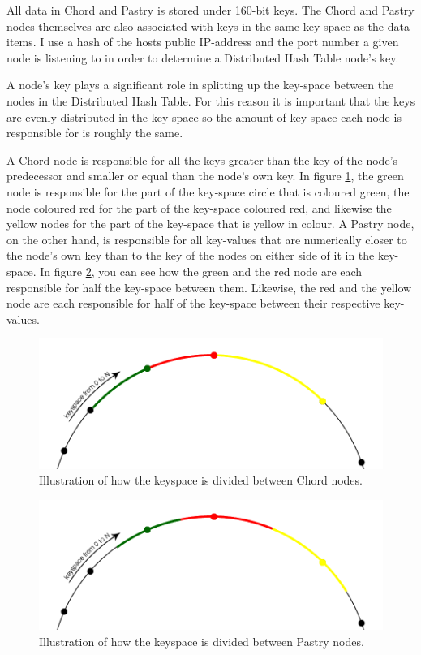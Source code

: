 All data in Chord and Pastry is stored under 160-bit keys. The Chord and Pastry nodes themselves are also associated with keys in the same key-space as the data items. I use a hash of the hosts public IP-address and the port number a given node is listening to in order to determine a Distributed Hash Table node's key.

A node's key plays a significant role in splitting up the key-space between the nodes in the Distributed Hash Table. For this reason it is important that the keys are evenly distributed in the key-space so the amount of key-space each node is responsible for is roughly the same.

A Chord node is responsible for all the keys greater than the key of the node's predecessor and smaller or equal than the node's own key. In figure \ref{figKeyspaceChord}, the green node is responsible for the part of the key-space circle that is coloured green, the node coloured red for the part of the key-space coloured red, and likewise the yellow nodes for the part of the key-space that is yellow in colour.
A Pastry node, on the other hand, is responsible for all key-values that are numerically closer to the node's own key than to the key of the nodes on either side of it in the key-space. In figure \ref{figKeyspacePastry}, you can see how the green and the red node are each responsible for half the key-space between them. Likewise, the red and the yellow node are each responsible for half of the key-space between their respective key-values.

\begin{figure}[!htb]
\begin{center}
	\includegraphics[width=0.9\linewidth]{illustrations/ChordKeySpace.png}
  \caption{Illustration of how the keyspace is divided between Chord nodes.}
  \label{figKeyspaceChord}
\end{center}
\end{figure}

\begin{figure}[!htb]
\begin{center}
	\includegraphics[width=0.9\linewidth]{illustrations/PastryKeySpace.png}
  \caption{Illustration of how the keyspace is divided between Pastry nodes.}
  \label{figKeyspacePastry}
\end{center}
\end{figure}

